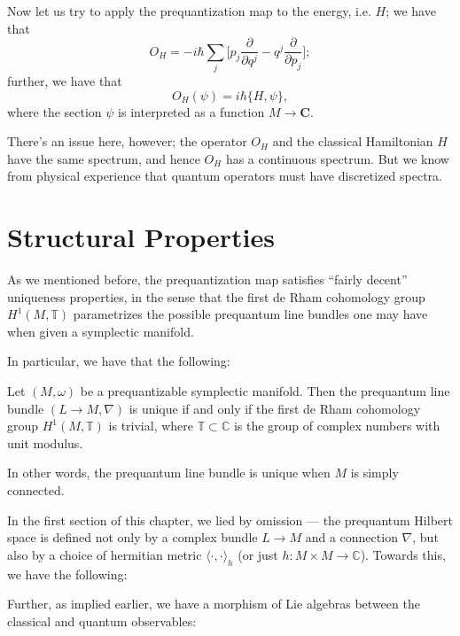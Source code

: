 \begin{itemize}
Now let us try to apply the prequantization map to the energy, i.e. $H$; we have that
$$
O_H = -i\hbar\sum_j\biggl[p_j\frac{\partial}{\partial q^j} - q^j\frac{\partial}{\partial p_j} \biggr];
$$
further, we have that
$$
O_H(\psi) = i\hbar\{H,\psi\},
$$
where the section $\psi$ is interpreted as a function $M \to \mathbf{C}$.

There's an issue here, however; the operator $O_H$ and the classical Hamiltonian $H$ have the same spectrum, and hence $O_H$ has a continuous spectrum. But we know from physical experience that quantum operators must have discretized spectra.
\end{itemize}













\section{Structural Properties}

As we mentioned before, the prequantization map satisfies ``fairly decent'' uniqueness properties, in the sense that the first de Rham cohomology group $H^1(M,\mathbb{T})$ parametrizes the possible prequantum line bundles one may have when given a symplectic manifold.

In particular, we have that the following:
\begin{thrm}
Let $(M,\omega)$ be a prequantizable symplectic manifold. Then the prequantum line bundle $(L\to M, \nabla)$ is unique if and only if the first de Rham cohomology group $H^1(M,\mathbb{T})$ is trivial, where $\mathbb{T} \subset \mathbb{C}$ is the group of complex numbers with unit modulus.%
\end{thrm}
In other words, the prequantum line bundle is unique when $M$ is simply connected.

In the first section of this chapter, we lied by omission --- the prequantum Hilbert space is defined not only by a complex bundle $L \to M$ and a connection $\nabla$, but also by a choice of hermitian metric $\langle \cdot,\cdot \rangle_h$ (or just $h: M \times M \to \mathbb{C}$). Towards this, we have the following:
\begin{thrm}
\end{thrm}

Further, as implied earlier, we have a morphism of Lie algebras between the classical and quantum observables:
\begin{thrm}
\end{thrm}